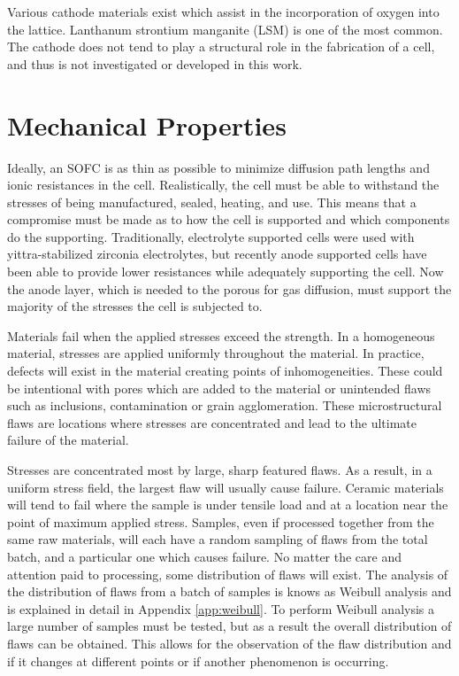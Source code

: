 Various cathode materials exist which assist in the incorporation of oxygen into the lattice.
Lanthanum strontium manganite (LSM) is one of the most common.
The cathode does not tend to play a structural role in the fabrication of a cell, and thus is not investigated or developed in this work.

\section{Mechanical Properties}

Ideally, an SOFC is as thin as possible to minimize diffusion path lengths and ionic resistances in the cell.\cite{Chan2001}
Realistically, the cell must be able to withstand the stresses of being manufactured, sealed, heating, and use.
This means that a compromise must be made as to how the cell is supported and which components do the supporting.
Traditionally, electrolyte supported cells were used with yittra-stabilized zirconia electrolytes, but recently anode supported cells have been able to provide lower resistances while adequately supporting the cell.\cite{Fleischhauer2014a,Laurencin2008}
Now the anode layer, which is needed to the porous for gas diffusion, must support the majority of the stresses the cell is subjected to.

Materials fail when the applied stresses exceed the strength.
In a homogeneous material, stresses are applied uniformly throughout the material.
In practice, defects will exist in the material creating points of inhomogeneities.
These could be intentional with pores which are added to the material or unintended flaws such as inclusions, contamination or grain agglomeration.
These microstructural flaws are locations where stresses are concentrated and lead to the ultimate failure of the material.

Stresses are concentrated most by large, sharp featured flaws.
As a result, in a uniform stress field, the largest flaw will usually cause failure.
Ceramic materials will tend to fail where the sample is under tensile load and at a location near the point of maximum applied stress.
Samples, even if processed together from the same raw materials, will each have a random sampling of flaws from the total batch, and a particular one which causes failure.
No matter the care and attention paid to processing, some distribution of flaws will exist.
The analysis of the distribution of flaws from a batch of samples is knows as Weibull analysis and is explained in detail in Appendix \ref{app:weibull}.
To perform Weibull analysis a large number of samples must be tested, but as a result the overall distribution of flaws can be obtained.
This allows for the observation of the flaw distribution and if it changes at different points or if another phenomenon is occurring.

